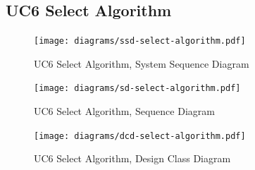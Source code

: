 \subsection{UC6 Select Algorithm}
\begin{figure}[H]
    \centering
    \texttt{[image: diagrams/ssd-select-algorithm.pdf]}
    \caption{UC6 Select Algorithm, System Sequence Diagram}
    \label{fig:select-algorithm-ssd}
\end{figure}
\begin{figure}[H]
    \centering
    \texttt{[image: diagrams/sd-select-algorithm.pdf]}
    \caption{UC6 Select Algorithm, Sequence Diagram}
    \label{fig:select-algorithm-sd}
\end{figure}
\begin{figure}[H]
    \centering
    \texttt{[image: diagrams/dcd-select-algorithm.pdf]}
    \caption{UC6 Select Algorithm, Design Class Diagram}
    \label{fig:select-algorithm-dcd}
\end{figure}
